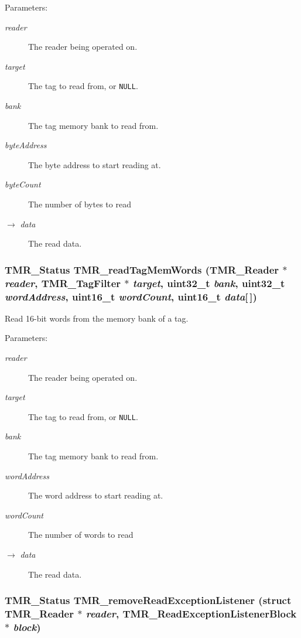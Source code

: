 \begin{Desc}
\item[Parameters:]
\begin{description}
\item[{\em reader}]The reader being operated on. \item[{\em target}]The tag to read from, or {\tt NULL}. \item[{\em bank}]The tag memory bank to read from. \item[{\em byteAddress}]The byte address to start reading at. \item[{\em byteCount}]The number of bytes to read \item[\mbox{$\rightarrow$} {\em data}]The read data. \end{description}
\end{Desc}
\hypertarget{group__reader_g3ab6bd275b40ef431a058fdc0e760eba}{
\subsubsection[{TMR\_\-readTagMemWords}]{\setlength{\rightskip}{0pt plus 5cm}TMR\_\-Status TMR\_\-readTagMemWords ({\bf TMR\_\-Reader} $\ast$ {\em reader}, \/  {\bf TMR\_\-TagFilter} $\ast$ {\em target}, \/  uint32\_\-t {\em bank}, \/  uint32\_\-t {\em wordAddress}, \/  uint16\_\-t {\em wordCount}, \/  uint16\_\-t {\em data}\mbox{[}$\,$\mbox{]})}}
\label{group__reader_g3ab6bd275b40ef431a058fdc0e760eba}


Read 16-bit words from the memory bank of a tag.

\begin{Desc}
\item[Parameters:]
\begin{description}
\item[{\em reader}]The reader being operated on. \item[{\em target}]The tag to read from, or {\tt NULL}. \item[{\em bank}]The tag memory bank to read from. \item[{\em wordAddress}]The word address to start reading at. \item[{\em wordCount}]The number of words to read \item[\mbox{$\rightarrow$} {\em data}]The read data. \end{description}
\end{Desc}
\hypertarget{group__reader_g89e04179bc7e159f9cccb070e1c77944}{
\subsubsection[{TMR\_\-removeReadExceptionListener}]{\setlength{\rightskip}{0pt plus 5cm}TMR\_\-Status TMR\_\-removeReadExceptionListener (struct {\bf TMR\_\-Reader} $\ast$ {\em reader}, \/  {\bf TMR\_\-ReadExceptionListenerBlock} $\ast$ {\em block})}}
\label{group__reader_g89e04179bc7e159f9cccb070e1c77944}


